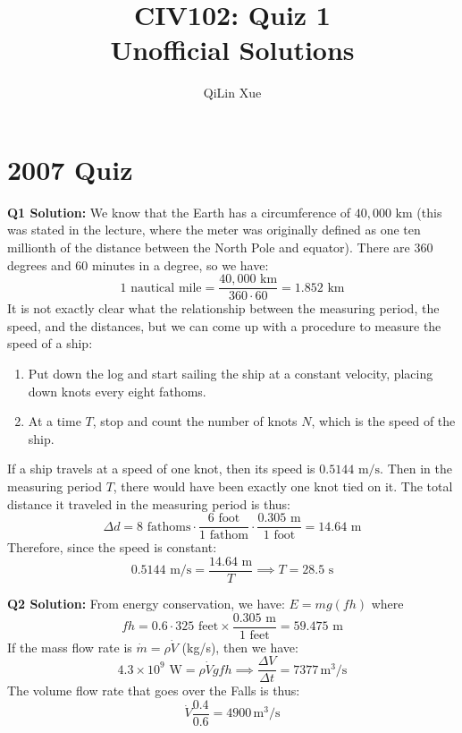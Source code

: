 \documentclass{article}
\title{CIV102: Quiz 1 \\ Unofficial Solutions}
\author{QiLin Xue}
\date{}
\begin{document}
\maketitle
\section*{2007 Quiz}
\textbf{Q1 Solution:} We know that the Earth has a circumference of $40,000 \text{ km}$ (this was stated in the lecture, where the meter was originally defined as one ten millionth of the distance between the North Pole and equator). There are $360$ degrees and $60$ minutes in a degree, so we have:
\begin{equation}
    1 \text{ nautical mile} = \frac{40,000 \text{ km}}{360\cdot 60} = 1.852 \text{ km}
\end{equation}
It is not exactly clear what the relationship between the measuring period, the speed, and the distances, but we can come up with a procedure to measure the speed of a ship:
\begin{enumerate}
    \item Put down the log and start sailing the ship at a constant velocity, placing down knots every eight fathoms.
    \item At a time $T$, stop and count the number of knots $N$, which is the speed of the ship.
\end{enumerate}
If a ship travels at a speed of one knot, then its speed is $0.5144 \text{ m/s}.$ Then in the measuring period $T$, there would have been exactly one knot tied on it. The total distance it traveled in the measuring period is thus:
\begin{equation}
    \Delta d = 8 \text{ fathoms} \cdot \frac{6 \text{ foot}}{1 \text{ fathom}} \cdot \frac{0.305 \text{ m}}{1 \text{ foot}} = 14.64 \text{ m}
    \label{eq:}
\end{equation}
Therefore, since the speed is constant:
\begin{equation}
    0.5144 \text{ m/s}= \frac{14.64 \text{ m}}{T} \implies T=28.5 \text{ s}
\end{equation}

\textbf{Q2 Solution:}
From energy conservation, we have: $E=mg(fh)$ where \begin{equation}
    fh=0.6\cdot 325 \text{ feet} \times \frac{0.305 \text{ m}}{1 \text{ feet}}=59.475 \text{ m}
    \label{eq:}
\end{equation}
If the mass flow rate is $\dot{m}=\rho\dot{V}$ (kg/s), then we have:
\begin{equation}
    4.3 \times 10^9 \text{ W} = \rho\dot{V}gfh \implies \frac{\Delta V}{\Delta t}=7377 \,\mathrm{m^3/s}
    \label{eq:}
\end{equation}
The volume flow rate that goes over the Falls is thus:
\begin{equation}
    \dot{V} \frac{0.4}{0.6}=4900 \,\mathrm{m^3/s}
    \label{eq:}
\end{equation}
\end{document}
